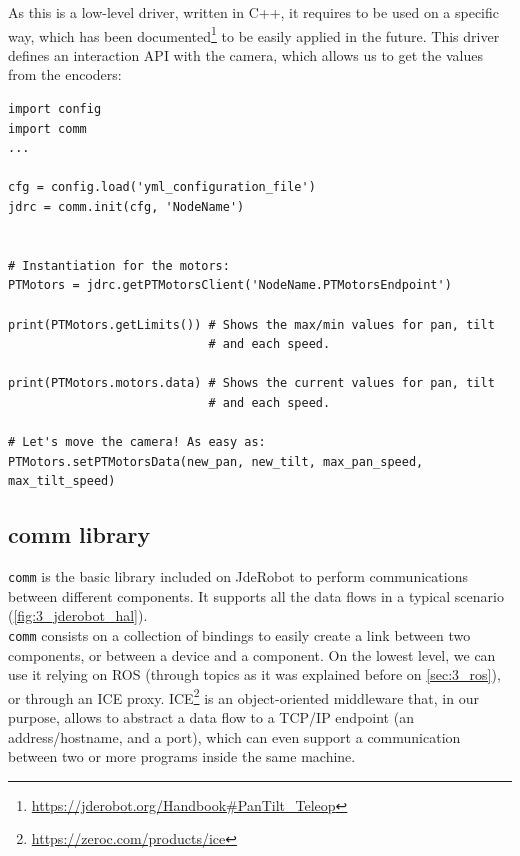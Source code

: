 	As this is a low-level driver, written in C++, it requires to be used on a specific way, which has been documented\footnote{\url{https://jderobot.org/Handbook\#PanTilt_Teleop}} to be easily applied in the future. This driver defines an interaction API with the camera, which allows us to get the values from the  encoders:
	\begin{lstlisting}
import config
import comm
...

cfg = config.load('yml_configuration_file')
jdrc = comm.init(cfg, 'NodeName')


# Instantiation for the motors:
PTMotors = jdrc.getPTMotorsClient('NodeName.PTMotorsEndpoint')

print(PTMotors.getLimits()) # Shows the max/min values for pan, tilt 
                            # and each speed.

print(PTMotors.motors.data) # Shows the current values for pan, tilt
                            # and each speed.

# Let's move the camera! As easy as:
PTMotors.setPTMotorsData(new_pan, new_tilt, max_pan_speed, max_tilt_speed)
	\end{lstlisting}
	
	\subsection{comm library}
		\label{sec:3_comm}
		\texttt{comm} is the basic library included on JdeRobot to perform communications between different components. It supports all the data flows in a typical scenario (\autoref{fig:3_jderobot_hal}).\\
		
		\texttt{comm} consists on a collection of bindings to easily create a link between two components, or between a device and a component. On the lowest level, we can use it relying on ROS (through topics as it was explained before on \autoref{sec:3_ros}), or through an ICE proxy. ICE\footnote{\url{https://zeroc.com/products/ice}} is an object-oriented middleware that, in our purpose, allows to abstract a data flow to a TCP/IP endpoint (an address/hostname, and a port), which can even support a communication between two or more programs inside the same machine.\\
		
